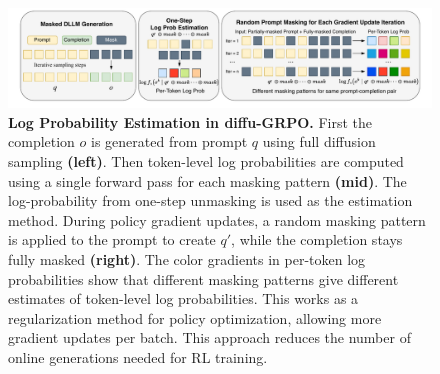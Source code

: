 \begin{figure}[ht]
    {\centering
    \includegraphics[width=1.0\textwidth]{"figs/d1_Scaling_Reasoning/diffu-GRPO.pdf"}
    \par}
    \caption{\textbf{Log Probability Estimation in diffu-GRPO.} First the completion $o$ is generated from prompt $q$ using full diffusion sampling \textbf{(left)}. Then token-level log probabilities are computed using a single forward pass for each masking pattern \textbf{(mid)}. The log-probability from one-step unmasking is used as the estimation method. During policy gradient updates, a random masking pattern is applied to the prompt to create $q'$, while the completion stays fully masked \textbf{(right)}. The color gradients in per-token log probabilities show that different masking patterns give different estimates of token-level log probabilities. This works as a regularization method for policy optimization, allowing more gradient updates per batch. This approach reduces the number of online generations needed for RL training.}
    \label{fig:diffu-GRPO}
\end{figure}

% 
% 
